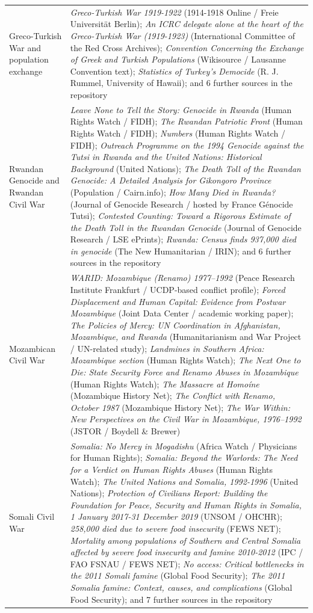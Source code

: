 \documentclass[11pt]{article}
\begin{document}
\begin{scriptsize}
\begin{longtable}{p{3.5cm} p{12.5cm}}
\addlinespace
Greco-Turkish War and population exchange & \emph{Greco-Turkish War 1919-1922} (1914-1918 Online / Freie Universität Berlin); \emph{An ICRC delegate alone at the heart of the Greco-Turkish War (1919-1923)} (International Committee of the Red Cross Archives); \emph{Convention Concerning the Exchange of Greek and Turkish Populations} (Wikisource / Lausanne Convention text); \emph{Statistics of Turkey's Democide} (R. J. Rummel, University of Hawaii); and 6 further sources in the repository \\
\addlinespace
Rwandan Genocide and Rwandan Civil War & \emph{Leave None to Tell the Story: Genocide in Rwanda} (Human Rights Watch / FIDH); \emph{The Rwandan Patriotic Front} (Human Rights Watch / FIDH); \emph{Numbers} (Human Rights Watch / FIDH); \emph{Outreach Programme on the 1994 Genocide against the Tutsi in Rwanda and the United Nations: Historical Background} (United Nations); \emph{The Death Toll of the Rwandan Genocide: A Detailed Analysis for Gikongoro Province} (Population / Cairn.info); \emph{How Many Died in Rwanda?} (Journal of Genocide Research / hosted by France Génocide Tutsi); \emph{Contested Counting: Toward a Rigorous Estimate of the Death Toll in the Rwandan Genocide} (Journal of Genocide Research / LSE ePrints); \emph{Rwanda: Census finds 937,000 died in genocide} (The New Humanitarian / IRIN); and 6 further sources in the repository \\
\addlinespace
Mozambican Civil War & \emph{WARID: Mozambique (Renamo) 1977–1992} (Peace Research Institute Frankfurt / UCDP-based conflict profile); \emph{Forced Displacement and Human Capital: Evidence from Postwar Mozambique} (Joint Data Center / academic working paper); \emph{The Policies of Mercy: UN Coordination in Afghanistan, Mozambique, and Rwanda} (Humanitarianism and War Project / UN-related study); \emph{Landmines in Southern Africa: Mozambique section} (Human Rights Watch); \emph{The Next One to Die: State Security Force and Renamo Abuses in Mozambique} (Human Rights Watch); \emph{The Massacre at Homoíne} (Mozambique History Net); \emph{The Conflict with Renamo, October 1987} (Mozambique History Net); \emph{The War Within: New Perspectives on the Civil War in Mozambique, 1976–1992} (JSTOR / Boydell \& Brewer) \\
\addlinespace
Somali Civil War & \emph{Somalia: No Mercy in Mogadishu} (Africa Watch / Physicians for Human Rights); \emph{Somalia: Beyond the Warlords: The Need for a Verdict on Human Rights Abuses} (Human Rights Watch); \emph{The United Nations and Somalia, 1992-1996} (United Nations); \emph{Protection of Civilians Report: Building the Foundation for Peace, Security and Human Rights in Somalia, 1 January 2017-31 December 2019} (UNSOM / OHCHR); \emph{258,000 died due to severe food insecurity} (FEWS NET); \emph{Mortality among populations of Southern and Central Somalia affected by severe food insecurity and famine 2010-2012} (IPC / FAO FSNAU / FEWS NET); \emph{No access: Critical bottlenecks in the 2011 Somali famine} (Global Food Security); \emph{The 2011 Somalia famine: Context, causes, and complications} (Global Food Security); and 7 further sources in the repository \\

\end{longtable}
\end{scriptsize}
\end{document}
